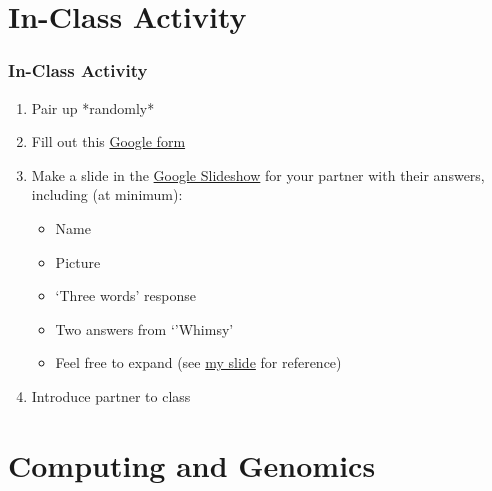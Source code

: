 \documentclass[14pt]{beamer}
\begin{document}
\section{In-Class Activity}

\begin{frame}
\frametitle{In-Class Activity}
	\begin{enumerate}
	\item<1-> Pair up *randomly*
	\item<2-> Fill out this \href{https://goo.gl/forms/fnCaNIcwQiNiawcv1}{Google form}
	\item<3-> Make a slide in the \href{https://docs.google.com/presentation/d/1WxVQJGrBO8NxQ2ZJwvZy2W61qAQYqN9V8a_xRUflU7w/edit?usp=sharing}{Google Slideshow} for your partner with their answers, including (at minimum):
		\begin{itemize}
		\item<4-> Name
		\item<4-> Picture
		\item<4-> `Three words' response
		\item<4-> Two answers from `'Whimsy'
		\item<4-> Feel free to expand (see \href{https://docs.google.com/presentation/d/1WxVQJGrBO8NxQ2ZJwvZy2W61qAQYqN9V8a_xRUflU7w/edit?usp=sharing}{my slide} for reference)
		\end{itemize}
	\item<5-> Introduce partner to class
	\end{enumerate}
\end{frame}

\section{Computing and Genomics}
\end{document}
